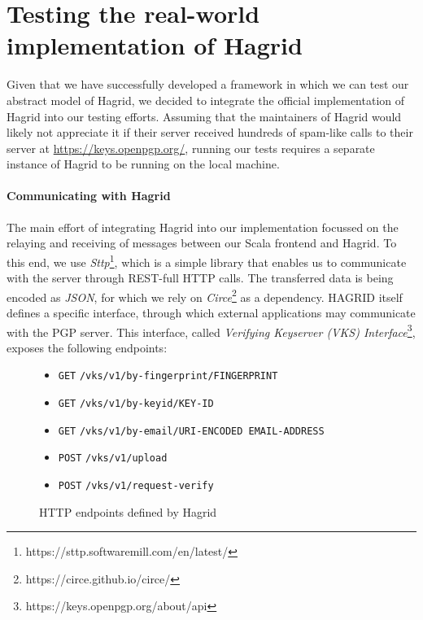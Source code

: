 \section{Testing the real-world implementation of Hagrid}
\label{sec:real_hagrid}
Given that we have successfully developed a framework in which we can test our abstract model of Hagrid, we decided to integrate the official implementation of Hagrid into our testing efforts.
Assuming that the maintainers of Hagrid would likely not appreciate it if their server received hundreds of spam-like calls to their server at \url{https://keys.openpgp.org/}, running our tests requires a separate instance of Hagrid to be running on the local machine.

\paragraph{Communicating with Hagrid}
The main effort of integrating Hagrid into our implementation focussed on the relaying and receiving of messages between our Scala frontend and Hagrid.
To this end, we use \emph{Sttp}\footnote{https://sttp.softwaremill.com/en/latest/}, which is a simple library that enables us to communicate with the server through REST-full HTTP calls. The transferred data is being encoded as \emph{JSON}, for which we rely on \emph{Circe}\footnote{https://circe.github.io/circe/} as a dependency. HAGRID itself defines a specific interface, through which external applications may communicate with the PGP server. This interface, called \emph{Verifying Keyserver (VKS) Interface}\footnote{https://keys.openpgp.org/about/api}, exposes the following endpoints: 
\begin{figure}[h]
    \begin{itemize}
        \item \texttt{GET}  \texttt{/vks/v1/by-fingerprint/FINGERPRINT}
        \item \texttt{GET}  \texttt{/vks/v1/by-keyid/KEY-ID}
        \item \texttt{GET}  \texttt{/vks/v1/by-email/URI-ENCODED EMAIL-ADDRESS}
        \item \texttt{POST} \texttt{/vks/v1/upload}
        \item \texttt{POST} \texttt{/vks/v1/request-verify}
    \end{itemize}
    \caption{HTTP endpoints defined by Hagrid}
\end{figure}

